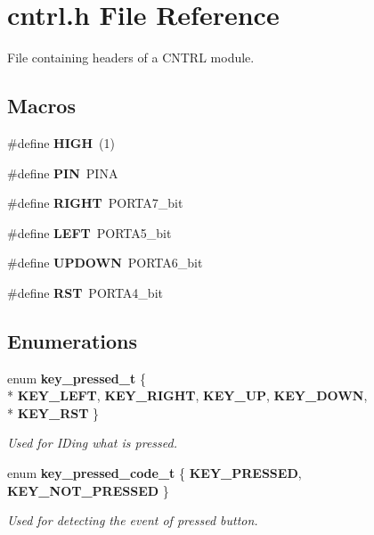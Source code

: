 \section{cntrl.\+h File Reference}
\label{cntrl_8h}


File containing headers of a C\+N\+T\+RL module.  


\subsection*{Macros}
\begin{DoxyCompactItemize}
\item 
\#define {\bfseries H\+I\+GH}~(1)\label{cntrl_8h_a5bb885982ff66a2e0a0a45a8ee9c35e2}

\item 
\#define {\bfseries P\+IN}~P\+I\+NA\label{cntrl_8h_ae1a27401b7fb01ccb9a82dbddbb54eea}

\item 
\#define {\bfseries R\+I\+G\+HT}~P\+O\+R\+T\+A7\+\_\+bit\label{cntrl_8h_a80fb826a684cf3f0d306b22aa100ddac}

\item 
\#define {\bfseries L\+E\+FT}~P\+O\+R\+T\+A5\+\_\+bit\label{cntrl_8h_a437ef08681e7210d6678427030446a54}

\item 
\#define {\bfseries U\+P\+D\+O\+WN}~P\+O\+R\+T\+A6\+\_\+bit\label{cntrl_8h_a10698f58ad07c768bee6e2a54ae1fc1c}

\item 
\#define {\bfseries R\+ST}~P\+O\+R\+T\+A4\+\_\+bit\label{cntrl_8h_ac5d957e4fd3dc11cd97a54cf9ca057a4}

\end{DoxyCompactItemize}
\subsection*{Enumerations}
\begin{DoxyCompactItemize}
\item 
enum {\bf key\+\_\+pressed\+\_\+t} \{ \\*
{\bfseries K\+E\+Y\+\_\+\+L\+E\+FT}, 
{\bfseries K\+E\+Y\+\_\+\+R\+I\+G\+HT}, 
{\bfseries K\+E\+Y\+\_\+\+UP}, 
{\bfseries K\+E\+Y\+\_\+\+D\+O\+WN}, 
\\*
{\bfseries K\+E\+Y\+\_\+\+R\+ST}
 \}\label{cntrl_8h_a542ccb08c4eb7e74d19f737f9ccd6443}
\begin{DoxyCompactList}\small\item\em Used for I\+Ding what is pressed. \end{DoxyCompactList}
\item 
enum {\bf key\+\_\+pressed\+\_\+code\+\_\+t} \{ {\bfseries K\+E\+Y\+\_\+\+P\+R\+E\+S\+S\+ED}, 
{\bfseries K\+E\+Y\+\_\+\+N\+O\+T\+\_\+\+P\+R\+E\+S\+S\+ED}
 \}\label{cntrl_8h_a7bd80d3edc77bd302e58692f4aed1c16}
\begin{DoxyCompactList}\small\item\em Used for detecting the event of pressed button. \end{DoxyCompactList}
\end{DoxyCompactItemize}

